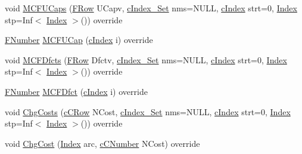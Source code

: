 \begin{DoxyCompactItemize}
\item 
void \mbox{\hyperlink{class_m_c_f_simplex_aa5d64c820aa5952a8cd80d4a89eb334a}{M\+C\+F\+U\+Caps}} (\mbox{\hyperlink{class_m_c_f_class_a9dae1f1a39c208ce3c2b337cd5bb3d00}{F\+Row}} U\+Capv, \mbox{\hyperlink{class_m_c_f_class_a81575b2d4e4d5636b17170432150ae69}{c\+Index\+\_\+\+Set}} nms=N\+U\+LL, \mbox{\hyperlink{class_m_c_f_class_a76aaabb20535c51a2752b93f6c38fe54}{c\+Index}} strt=0, \mbox{\hyperlink{class_m_c_f_class_ad53d6229d7ec28555a9c9c2fd9abf773}{Index}} stp=Inf$<$ \mbox{\hyperlink{class_m_c_f_class_ad53d6229d7ec28555a9c9c2fd9abf773}{Index}} $>$()) override
\item 
\mbox{\hyperlink{class_m_c_f_class_aeea3e5951d222b2a8e57de1b4246a909}{F\+Number}} \mbox{\hyperlink{class_m_c_f_simplex_a1dc1ae53fb2a2984318a9b4e62702ec6}{M\+C\+F\+U\+Cap}} (\mbox{\hyperlink{class_m_c_f_class_a76aaabb20535c51a2752b93f6c38fe54}{c\+Index}} i) override
\item 
void \mbox{\hyperlink{class_m_c_f_simplex_ad733f5fefcf64289d412534d229ff26f}{M\+C\+F\+Dfcts}} (\mbox{\hyperlink{class_m_c_f_class_a9dae1f1a39c208ce3c2b337cd5bb3d00}{F\+Row}} Dfctv, \mbox{\hyperlink{class_m_c_f_class_a81575b2d4e4d5636b17170432150ae69}{c\+Index\+\_\+\+Set}} nms=N\+U\+LL, \mbox{\hyperlink{class_m_c_f_class_a76aaabb20535c51a2752b93f6c38fe54}{c\+Index}} strt=0, \mbox{\hyperlink{class_m_c_f_class_ad53d6229d7ec28555a9c9c2fd9abf773}{Index}} stp=Inf$<$ \mbox{\hyperlink{class_m_c_f_class_ad53d6229d7ec28555a9c9c2fd9abf773}{Index}} $>$()) override
\item 
\mbox{\hyperlink{class_m_c_f_class_aeea3e5951d222b2a8e57de1b4246a909}{F\+Number}} \mbox{\hyperlink{class_m_c_f_simplex_a160bbf78d4101054d9390b7e1a838eea}{M\+C\+F\+Dfct}} (\mbox{\hyperlink{class_m_c_f_class_a76aaabb20535c51a2752b93f6c38fe54}{c\+Index}} i) override
\item 
void \mbox{\hyperlink{class_m_c_f_simplex_a1f8f2db739c0307ee7f4383972821e12}{Chg\+Costs}} (\mbox{\hyperlink{class_m_c_f_class_ab700102e9ba8bb6015be6818d4e99097}{c\+C\+Row}} N\+Cost, \mbox{\hyperlink{class_m_c_f_class_a81575b2d4e4d5636b17170432150ae69}{c\+Index\+\_\+\+Set}} nms=N\+U\+LL, \mbox{\hyperlink{class_m_c_f_class_a76aaabb20535c51a2752b93f6c38fe54}{c\+Index}} strt=0, \mbox{\hyperlink{class_m_c_f_class_ad53d6229d7ec28555a9c9c2fd9abf773}{Index}} stp=Inf$<$ \mbox{\hyperlink{class_m_c_f_class_ad53d6229d7ec28555a9c9c2fd9abf773}{Index}} $>$()) override
\item 
void \mbox{\hyperlink{class_m_c_f_simplex_a5b694b932ddb1fc61d9f3d66aaca10e1}{Chg\+Cost}} (\mbox{\hyperlink{class_m_c_f_class_ad53d6229d7ec28555a9c9c2fd9abf773}{Index}} arc, \mbox{\hyperlink{class_m_c_f_class_a07dbefeeb08c3f63073622411893eb76}{c\+C\+Number}} N\+Cost) override

\end{DoxyCompactItemize}
